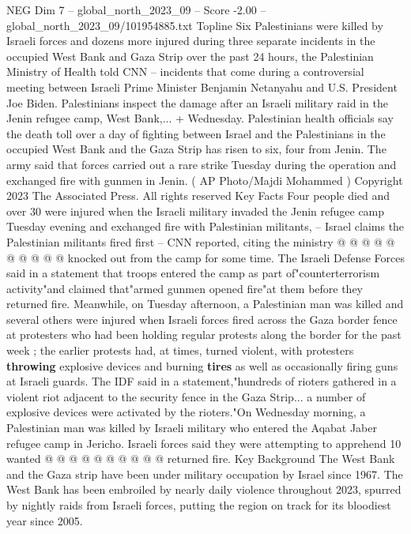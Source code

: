 \begin{textsample}{NEG Dim 7 – global\_north\_2023\_09 – Score -2.00 – global\_north\_2023\_09/101954885.txt}  \label{ex:f7_neg_170}
Topline Six Palestinians were killed by Israeli forces and dozens more injured during three separate incidents in the occupied West Bank and Gaza Strip over the past 24 hours, the Palestinian Ministry of Health told CNN -- incidents that come during a controversial meeting between Israeli Prime Minister Benjamin Netanyahu and U.S.
President Joe Biden.
Palestinians inspect the damage after an Israeli military raid in the Jenin refugee camp, West Bank,... + Wednesday.
Palestinian health officials say the death toll over a day of fighting between Israel and the Palestinians in the occupied West Bank and the Gaza Strip has risen to six, four from Jenin.
The army said that forces carried out a rare strike Tuesday during the operation and exchanged fire with gunmen in Jenin. ( AP Photo/Majdi Mohammed ) Copyright 2023 The Associated Press.
All rights reserved Key Facts Four people died and over 30 were injured when the Israeli military invaded the Jenin refugee camp Tuesday evening and exchanged fire with Palestinian militants, -- Israel claims the Palestinian militants fired first -- CNN reported, citing the ministry @ @ @ @ @ @ @ @ @ @ knocked out from the camp for some time.
The Israeli Defense Forces said in a statement that troops entered the camp as part of"counterterrorism activity"and claimed that"armed gunmen opened fire"at them before they returned fire.
Meanwhile, on Tuesday afternoon, a Palestinian man was killed and several others were injured when Israeli forces fired across the Gaza border fence at protesters who had been holding regular protests along the border for the past week ; the earlier protests had, at times, turned violent, with protesters \textbf{throwing} explosive devices and burning \textbf{tires} as well as occasionally firing guns at Israeli guards.
The IDF said in a statement,"hundreds of rioters gathered in a violent riot adjacent to the security fence in the Gaza Strip... a number of explosive devices were activated by the rioters."On Wednesday morning, a Palestinian man was killed by Israeli military who entered the Aqabat Jaber refugee camp in Jericho.
Israeli forces said they were attempting to apprehend 10 wanted @ @ @ @ @ @ @ @ @ @ returned fire.
Key Background The West Bank and the Gaza strip have been under military occupation by Israel since 1967.
The West Bank has been embroiled by nearly daily violence throughout 2023, spurred by nightly raids from Israeli forces, putting the region on track for its bloodiest year since 2005.

\end{textsample}
